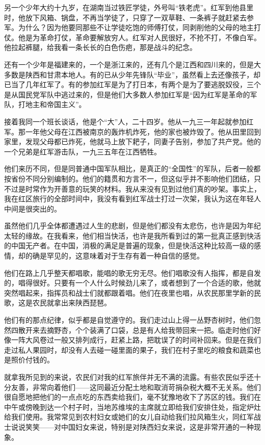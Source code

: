 \documentclass[10pt]{book}
\begin{document}
另一个少年大约十九岁，在湖南当过铁匠学徒，外号叫“铁老虎”。红军到他县里时，他放下风箱、锅盘，不再当学徒了，只穿了一双草鞋、一条裤子就赶紧去参军。为什么？因为他要同那些不让学徒吃饱的师傅打仗，同剥削他的父母的地主打仗。他是为革命打仗，革命要解放穷人。红军对人民很好，不抢不打，不像白军。他拉起裤腿，给我看一条长长的白色伤疤，那是战斗的纪念。

还有一个少年是福建来的，一个是浙江来的，还有几个是江西和四川来的，但是大多数是陕西和甘肃本地人。有的已从少年先锋队“毕业”，虽然看上去还像孩子，却已当了几年红军了。有的参加红军是为了打日本，有两个是为了要逃脱奴役，三个是从国民党军队中逃过来的，但是他们大多数人参加红军是“因为红军是革命的军队，打地主和帝国主义”。

接着我同一个班长谈话，他是个“大”人，二十四岁。他从一九三一年起就参加红军。那一年他父母在江西被南京的轰炸机炸死，他的家也被炸毁了。他从田里回到家里，发现父母都已炸死，他就马上放下耙子，同妻子告别，参加了共产党。他的一个兄弟是红军游击队，一九三五年在江西牺牲。

他们来历不同，但是同普通中国军队相比，是真正的“全国性”的军队，后者一般都按省份不同分别编制的。他们的籍贯和方言不一，但这似乎并不影响他们团结，只不过是时常作为开善意的玩笑的材料。我从来没有见到过他们真的吵架。事实上，我在红区旅行的全部时间中，我没有看到红军战士打过一次架，我认为这在年轻人中间是很突出的。

虽然他们几乎全体都遭遇过人生的悲剧，但是他们都没有太悲伤，也许是因为年纪太轻的缘故。在我看来，他们相当快活，也许是我所看到过的第一批真正感到快活的中国无产者。在中国，消极的满足是普遍的现象，但是快活这种比较高一级的感情，却的确是罕见的，这意味着对于生存有着一种自信的感觉。

他们在路上几乎整天都唱歌，能唱的歌无穷无尽。他们唱歌没有人指挥，都是自发的，唱得很好。只要有一个人什么时候劲儿来了，或者想到了一个合适的歌，他就突然唱起来，指挥员和战士们就都跟着唱。他们在夜里也唱，从农民那里学新的民歌，这是农民就拿出来陕西琵琶。

他们有的那点纪律，似乎都是自觉遵守的。我们走过山上得一丛野杏树时，他们忽然四散开来去摘野杏，个个装满了口袋，总是有人给我带回来一把。临走时他们好像一阵大风卷过一般又排列成行，赶紧上路，把耽误了的时间补回来。但是在我们走过私人果园时，却没有人去碰一碰里面的果子，我们在村子里吃的粮食和蔬菜也是照价付钱的。

就拿我所见到的来说，农民们对我的红军旅伴并无不满的流露。有些农民似乎还十分友善，非常向着他们——这同最近分配土地和取消苛捐杂税大概不无关系。他们很自愿地把他们的一点点吃的东西卖给我们，毫不犹豫地收下了苏区的钱。我们在中午或傍晚到达一个村子时，当地苏维埃的主席就立即给我们安排住处，指定炉灶给我们使用。我常常见到农村妇女或她们的女儿自动给我们拉风箱生火，同红军战士说说笑笑——对中国妇女来说，特别是对陕西妇女来说，这是非常开通的一种现象。
\end{document}

